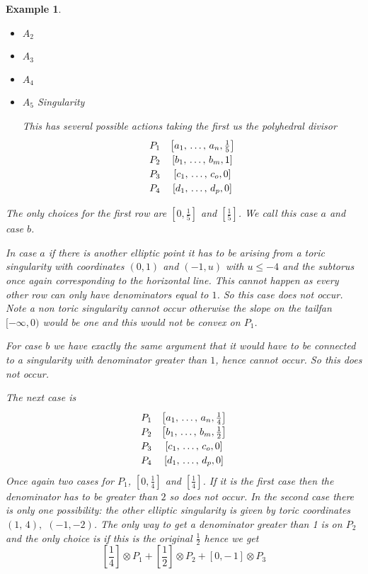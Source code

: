 \documentclass[12pt,a4paper]{book}      %
\newtheorem{ex}[thm]{Example}
\begin{document}
\begin{ex}
\begin{itemize}
\item $A_2$

\item $A_3$

\item $A_4$

\item \begin{bf} $A_5$ Singularity \end{bf}

This has several possible actions taking the first us the polyhedral divisor 
\[\def\arraystretch{1.2}
\begin{array}{cc}
P_1 & \left[ a_1, \, \dots , \, a_n, \frac{1}{5} \right] \\ 
P_2 & \left[b_1 , \, \dots, \, b_m, 1\right] \\
P_3 & \left[c_1, \, \dots, \, c_o, 0\right] \\
P_4 & \left[d_1, \, \dots, \, d_p, 0\right]  \\
\end{array}
\]
\end{itemize}
The only choices for the first row are $[0, \frac{1}{5}]$ and $[\frac{1}{5}]$. We call this case $a$ and case $b$. 

In case $a$ if there is another elliptic point it has to be arising from a toric singularity with coordinates $(0, 1)$ and $(-1, u)$ with $u \leq -4$ and the subtorus once again corresponding to the horizontal line.
This cannot happen as every other row can only have denominators equal to $1$. So this case does not occur. Note a non toric singularity cannot occur otherwise the slope on the tailfan $[-\infty , 0)$ would be one and this would not be convex on $P_1$.

For case $b$ we have exactly the same argument that it would have to be connected to a singularity with denominator greater than $1$, hence cannot occur. So this does not occur. 


The next case is 
\[\def\arraystretch{1.2}
\begin{array}{cc}
P_1 & \left[ a_1, \, \dots , \, a_n, \frac{1}{4} \right] \\ 
P_2 & \left[b_1 , \, \dots, \, b_m, \frac{1}{2} \right] \\
P_3 & \left[c_1, \, \dots, \, c_o, 0\right] \\
P_4 & \left[d_1, \, \dots, \, d_p, 0\right]  \\
\end{array}
\]
Once again two cases for $P_1$,  $[0, \frac{1}{4}]$ and $[\frac{1}{4}]$. If it is the first case then the denominator has to be greater than $2$ so does not occur. In the second case there is only one possibility: the other elliptic singularity is given by toric coordinates $(1, \, 4),$ $(-1, -2)$. The only way to get a denominator greater than 1 is on $P_2$ and  the only choice is if this is the original $\frac{1}{2}$ hence we get
\[
\left[\frac{1}{4} \right] \otimes P_1 + \left[\frac{1}{2} \right] \otimes P_2 + [0, -\, 1] \otimes P_3
\]


\end{ex}
\end{document}
